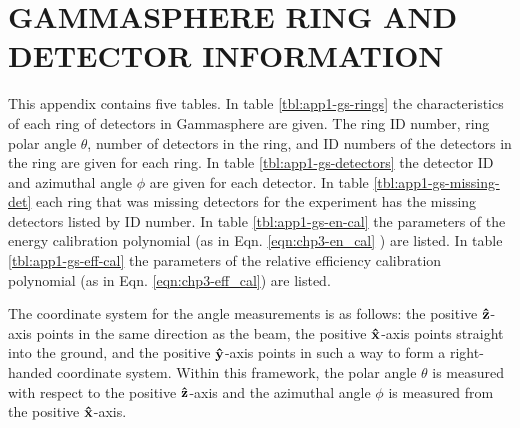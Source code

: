 %
%

\chapter{GAMMASPHERE RING AND DETECTOR INFORMATION}
\label{app:gs-rings-and-detectors}
This appendix contains five tables. In table \ref{tbl:app1-gs-rings} the characteristics of each ring of detectors in Gammasphere are given. The ring ID number, ring polar angle $\theta$, number of detectors in the ring, and ID numbers of the detectors in the ring are given for each ring. In table \ref{tbl:app1-gs-detectors} the detector ID and azimuthal angle $\phi$ are given for each detector. In table \ref{tbl:app1-gs-missing-det} each ring that was missing detectors for the experiment has the missing detectors listed by ID number. In table \ref{tbl:app1-gs-en-cal} the parameters of the energy calibration polynomial (as in Eqn. \ref{eqn:chp3-en_cal} ) are listed. In table \ref{tbl:app1-gs-eff-cal} the parameters of the relative efficiency calibration polynomial (as in Eqn. \ref{eqn:chp3-eff_cal}) are listed.

The coordinate system for the angle measurements is as follows: the positive $\boldsymbol{\hat{\textbf{z}}}$-axis points in the same direction as the beam, the positive $\boldsymbol{\hat{\textbf{x}}}$-axis points straight into the ground, and the positive $\boldsymbol{\hat{\textbf{y}}}$-axis points in such a way to form a right-handed coordinate system. Within this framework, the polar angle $\theta$ is measured with respect to the positive $\boldsymbol{\hat{\textbf{z}}}$-axis and the azimuthal angle $\phi$ is measured from the positive $\boldsymbol{\hat{\textbf{x}}}$-axis.


